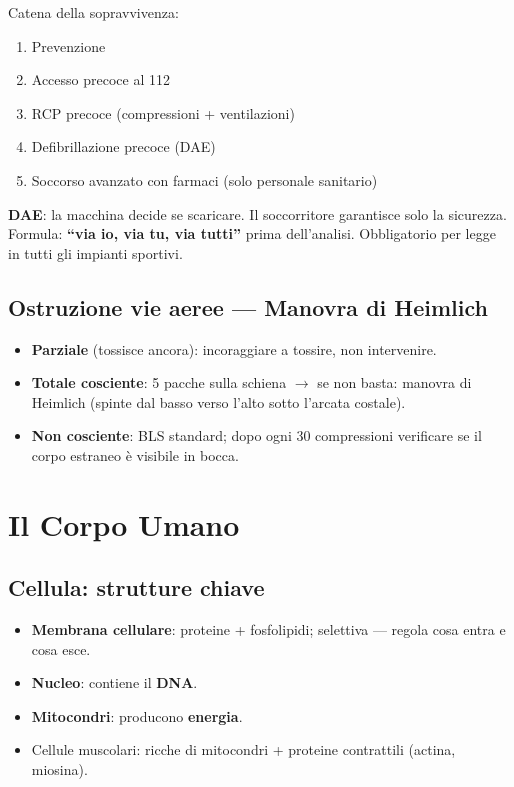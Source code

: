 \documentclass[12pt, a4paper]{article}
\begin{document}
Catena della sopravvivenza:
\begin{enumerate}
  \item Prevenzione
  \item Accesso precoce al 112
  \item RCP precoce (compressioni + ventilazioni)
  \item Defibrillazione precoce (DAE)
  \item Soccorso avanzato con farmaci (solo personale sanitario)
\end{enumerate}

\textbf{DAE}: la macchina decide se scaricare. Il soccorritore garantisce solo la sicurezza. Formula: \textbf{``via io, via tu, via tutti''} prima dell'analisi. Obbligatorio per legge in tutti gli impianti sportivi.

\subsection{Ostruzione vie aeree --- Manovra di Heimlich}

\begin{itemize}
  \item \textbf{Parziale} (tossisce ancora): incoraggiare a tossire, non intervenire.
  \item \textbf{Totale cosciente}: 5 pacche sulla schiena $\rightarrow$ se non basta: manovra di Heimlich (spinte dal basso verso l'alto sotto l'arcata costale).
  \item \textbf{Non cosciente}: BLS standard; dopo ogni 30 compressioni verificare se il corpo estraneo è visibile in bocca.
\end{itemize}

\section{Il Corpo Umano}

\subsection{Cellula: strutture chiave}

\begin{itemize}
  \item \textbf{Membrana cellulare}: proteine + fosfolipidi; selettiva --- regola cosa entra e cosa esce.
  \item \textbf{Nucleo}: contiene il \textbf{DNA}.
  \item \textbf{Mitocondri}: producono \textbf{energia}.
  \item Cellule muscolari: ricche di mitocondri + proteine contrattili (actina, miosina).
\end{itemize}
\end{document}
